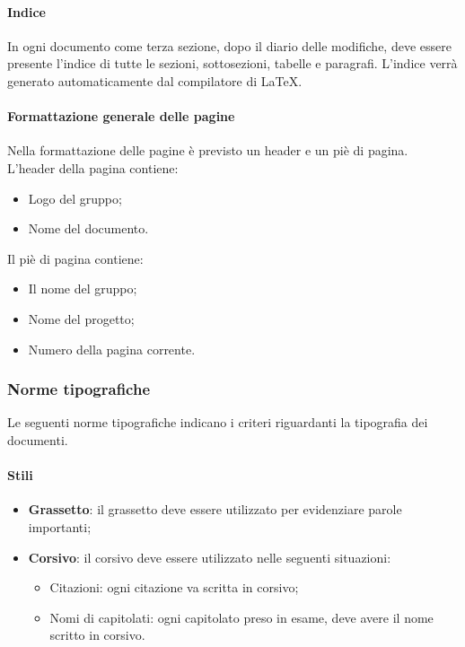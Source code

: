 \documentclass[../NormeDiProgetto.tex]{subfiles}
\begin{document}
\paragraph{Indice}
In ogni documento come terza sezione, dopo il diario delle modifiche, deve essere presente l'indice di tutte le sezioni, sottosezioni, tabelle e paragrafi.
L'indice verrà generato automaticamente dal compilatore di \LaTeX .

\paragraph{Formattazione generale delle pagine}
Nella formattazione delle pagine è previsto un header e un piè di pagina.
L'header della pagina contiene:
\begin{itemize}
  \item Logo del gruppo;
  \item Nome del documento.
\end{itemize}
Il piè di pagina contiene:
\begin{itemize}
  \item Il nome del gruppo;
  \item Nome del progetto;
  \item Numero della pagina corrente.
\end{itemize}

\subsubsection{Norme tipografiche}
Le seguenti norme tipografiche indicano i criteri riguardanti la tipografia dei documenti.

\paragraph{Stili}
\begin{itemize}
  \item \textbf{Grassetto}: il grassetto deve essere utilizzato per evidenziare parole importanti;
  \item \textbf{Corsivo}: il corsivo deve essere utilizzato nelle seguenti
  situazioni:
  \begin{itemize}
    \item Citazioni: ogni citazione va scritta in corsivo;
    \item Nomi di capitolati: ogni capitolato preso in esame, deve avere il nome scritto in corsivo.
  \end{itemize}
\end{itemize}
\end{document}
